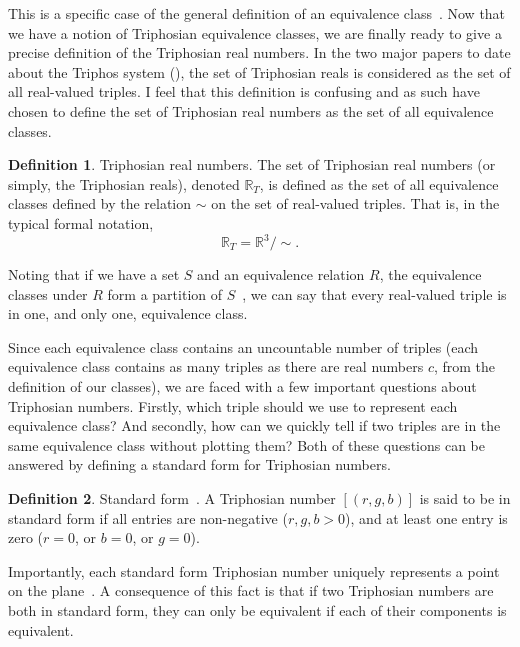 \documentclass[11pt]{article}
\newcommand{\Tri}{\mathbb{R}_T}
\theoremstyle{definition}
\newtheorem{definition}{Definition}
\theoremstyle{plain}
\theoremstyle{remark}
\begin{document}
	This is a specific case of the general definition of an equivalence
	class~\cite{enderton}. Now that we have a notion of Triphosian equivalence
	classes, we are finally ready to give a precise definition of the
	Triphosian real numbers. In the two major papers to date about the Triphos
	system (\cite{egging,grossnickle}), the set of Triphosian reals is
	considered as the set of all real-valued triples. I feel that this
	definition is confusing and as such have chosen to define the set of
	Triphosian real numbers as the set of all equivalence classes.

	\begin{definition}{Triphosian real numbers.} The set of Triphosian real
	numbers (or simply, the Triphosian reals), denoted \(\Tri\), is defined as
	the set of all equivalence classes defined by the relation \(\sim\) on the
	set of real-valued triples. That is, in the typical formal notation,
		\[\Tri = \mathbb{R}^3/\sim.\]
	\end{definition}

	Noting that if we have a set \(S\) and an equivalence relation \(R\), the
	equivalence classes under \(R\) form a partition of \(S\)~\cite{enderton},
	we can say that every real-valued triple is in one, and only one,
	equivalence class.

	Since each equivalence class contains an uncountable number of triples
	(each equivalence class contains as many triples as there are real numbers
	\(c\), from the definition of our classes), we are faced with a few
	important questions about Triphosian numbers. Firstly, which triple should
	we use to represent each equivalence class? And secondly, how can we
	quickly tell if two triples are in the same equivalence class without
	plotting them? Both of these questions can be answered by defining a
	standard form for Triphosian numbers.

	\begin{definition}{Standard form~\cite{egging}.} A Triphosian number
	\([(r,g,b)]\) is said to be in standard form if all entries are
	non-negative (\(r,g,b > 0\)), and at least one entry is zero (\(r = 0\), or
	\(b = 0\), or \(g = 0\)).
	\end{definition}

	Importantly, each standard form Triphosian number uniquely represents a
	point on the plane~\cite{grossnickle}. A consequence of this fact is that
	if two Triphosian numbers are both in standard form, they can only be
	equivalent if each of their components is equivalent.
\end{document}
